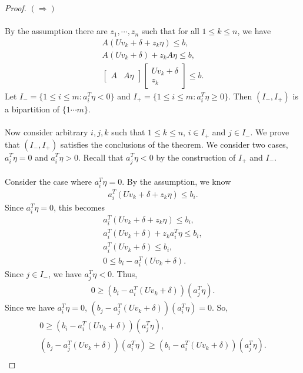 \documentclass[10pt,a4paper]{amsart}
\begin{document}
\begin{proof}
	$(\Longrightarrow)$
	\\\\
	By the assumption there are $z_1, \cdots, z_n$ such that for all $1 \leq k \leq n$, we have
	\begin{gather*}
		A(Uv_k + \delta+z_k\eta) \leq b,\\
		A(Uv_k + \delta)+z_kA\eta \leq b,\\
		\begin{bmatrix}A & A\eta\end{bmatrix}\begin{bmatrix}Uv_k + \delta \\ z_k\end{bmatrix} \leq b.
	\end{gather*}
	Let $I_- = \{1 \leq i \leq m:a_i^T\eta < 0\}$ and $I_+ = \{1 \leq i \leq m:a_i^T\eta \geq 0\}$. Then $(I_-, I_+)$ is a bipartition of $\{1 \cdots m\}$.\\\\
	Now consider arbitrary $i, j, k$ such that $1 \leq k \leq n$, $i \in I_+$ and $j \in I_-$. We prove that $(I_-, I_+)$ satisfies the conclusions of the theorem. We consider two cases, $a_i^T\eta = 0$ and $a_i^T\eta > 0$. Recall that $a_j^T\eta < 0$ by the construction of $I_+$ and $I_-$.\\\\
	Consider the case where $a_i^T\eta = 0$. By the assumption, we know
	\begin{gather*}
		a_i^T(Uv_k+\delta+z_k \eta) \leq b_i.
	\end{gather*}
	Since $a_i^T \eta = 0$, this becomes
	\begin{gather*}
		a_i^T(Uv_k+\delta+z_k \eta) \leq b_i,\\
		a_i^T(Uv_k+\delta)+z_k a_i^T\eta \leq b_i,\\
		a_i^T(Uv_k+\delta) \leq b_i,\\
		0 \leq b_i-a_i^T(Uv_k+\delta).
	\end{gather*}
	Since $j \in I_-$, we have $a_j^T\eta < 0$. Thus,
	\begin{gather*}
		0 \geq (b_i-a_i^T(Uv_k+\delta))(a_j^T\eta).
	\end{gather*}
	Since we have $a_i^T\eta = 0$, $(b_j-a_j^T(Uv_k+\delta))(a_i^T\eta) = 0$. So,
	\begin{gather*}
		0 \geq (b_i-a_i^T(Uv_k+\delta))(a_j^T\eta),\\
		(b_j-a_j^T(Uv_k+\delta))(a_i^T\eta) \geq (b_i-a_i^T(Uv_k+\delta))(a_j^T\eta).\\

\end{gather*}
\end{proof}
\end{document}
